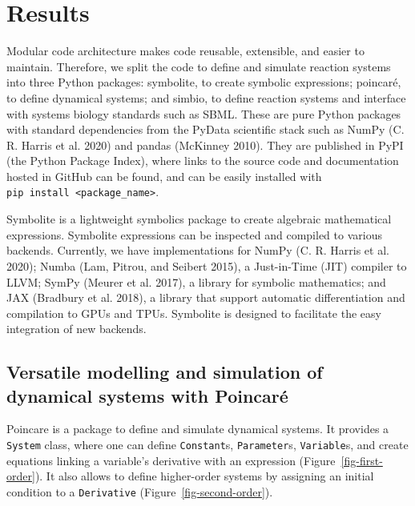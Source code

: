 \documentclass[
  letterpaper,
  DIV=11,
  numbers=noendperiod]{scrartcl}
\begin{document}
\hypertarget{results}{%
\section{Results}\label{results}}



Modular code architecture makes code reusable, extensible, and easier to
maintain. Therefore, we split the code to define and simulate reaction
systems into three Python packages: symbolite, to create symbolic
expressions; poincaré, to define dynamical systems; and simbio, to
define reaction systems and interface with systems biology standards
such as SBML. These are pure Python packages with standard dependencies
from the PyData scientific stack such as NumPy (C. R. Harris et al.
2020) and pandas (McKinney 2010). They are published in PyPI (the Python
Package Index), where links to the source code and documentation hosted
in GitHub can be found, and can be easily installed with
\texttt{pip\ install\ \textless{}package\_name\textgreater{}}.

Symbolite is a lightweight symbolics package to create algebraic
mathematical expressions. Symbolite expressions can be inspected and
compiled to various backends. Currently, we have implementations for
NumPy (C. R. Harris et al. 2020); Numba (Lam, Pitrou, and Seibert 2015),
a Just-in-Time (JIT) compiler to LLVM; SymPy (Meurer et al. 2017), a
library for symbolic mathematics; and JAX (Bradbury et al. 2018), a
library that support automatic differentiation and compilation to GPUs
and TPUs. Symbolite is designed to facilitate the easy integration of
new backends.

\hypertarget{versatile-modelling-and-simulation-of-dynamical-systems-with-poincaruxe9}{%
\subsection{Versatile modelling and simulation of dynamical systems with
Poincaré}\label{versatile-modelling-and-simulation-of-dynamical-systems-with-poincaruxe9}}



Poincare is a package to define and simulate dynamical systems. It
provides a \texttt{System} class, where one can define
\texttt{Constant}s, \texttt{Parameter}s, \texttt{Variable}s, and create
equations linking a variable's derivative with an expression
(Figure~\ref{fig-first-order}). It also allows to define higher-order
systems by assigning an initial condition to a \texttt{Derivative}
(Figure~\ref{fig-second-order}).
\end{document}
